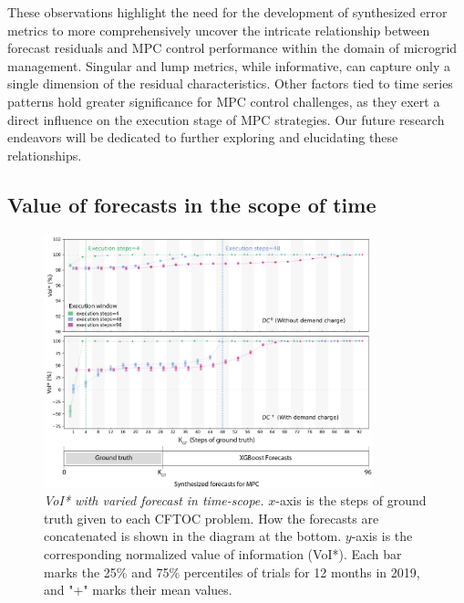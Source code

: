 These observations highlight the need for the development of synthesized error metrics to more comprehensively uncover the intricate relationship between forecast residuals and MPC control performance within the domain of microgrid management. Singular and lump metrics, while informative, can capture only a single dimension of the residual characteristics. Other factors tied to time series patterns hold greater significance for MPC control challenges, as they exert a direct influence on the execution stage of MPC strategies. Our future research endeavors will be dedicated to further exploring and elucidating these relationships.


\subsection{Value of forecasts in the scope of time}

\begin{figure}[!ht]
\centering
  \includegraphics[width=0.85\textwidth]{figures/VoI_timescope.png}
  \caption{\textit{VoI* with varied forecast in time-scope.} $x$-axis is the steps of ground truth given to each CFTOC problem. How the forecasts are concatenated is shown in the diagram at the bottom. $y$-axis is the corresponding normalized value of information (VoI*). Each bar marks the 25\% and 75\% percentiles of trials for 12 months in 2019, and "+" marks their mean values. }
  \label{fig:VoI-timescale}
\end{figure}


